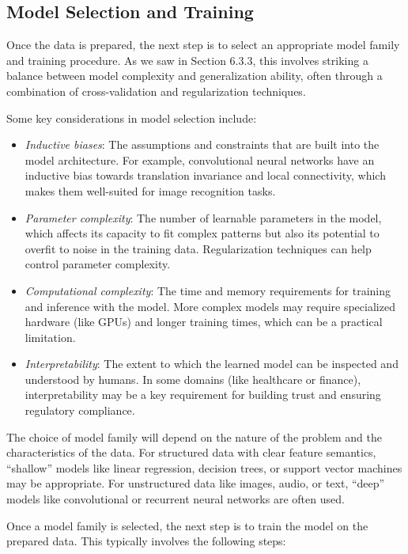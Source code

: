 \documentclass[
  9pt,
  letterpaper,
  abstract,
  titlepage]{scrbook}
\begin{document}
\subsection{Model Selection and
Training}\label{model-selection-and-training}

Once the data is prepared, the next step is to select an appropriate
model family and training procedure. As we saw in Section 6.3.3, this
involves striking a balance between model complexity and generalization
ability, often through a combination of cross-validation and
regularization techniques.

Some key considerations in model selection include:

\begin{itemize}
\item
  \emph{Inductive biases}: The assumptions and constraints that are
  built into the model architecture. For example, convolutional neural
  networks have an inductive bias towards translation invariance and
  local connectivity, which makes them well-suited for image recognition
  tasks.
\item
  \emph{Parameter complexity}: The number of learnable parameters in the
  model, which affects its capacity to fit complex patterns but also its
  potential to overfit to noise in the training data. Regularization
  techniques can help control parameter complexity.
\item
  \emph{Computational complexity}: The time and memory requirements for
  training and inference with the model. More complex models may require
  specialized hardware (like GPUs) and longer training times, which can
  be a practical limitation.
\item
  \emph{Interpretability}: The extent to which the learned model can be
  inspected and understood by humans. In some domains (like healthcare
  or finance), interpretability may be a key requirement for building
  trust and ensuring regulatory compliance.
\end{itemize}

The choice of model family will depend on the nature of the problem and
the characteristics of the data. For structured data with clear feature
semantics, ``shallow'' models like linear regression, decision trees, or
support vector machines may be appropriate. For unstructured data like
images, audio, or text, ``deep'' models like convolutional or recurrent
neural networks are often used.

Once a model family is selected, the next step is to train the model on
the prepared data. This typically involves the following steps:
\end{document}
